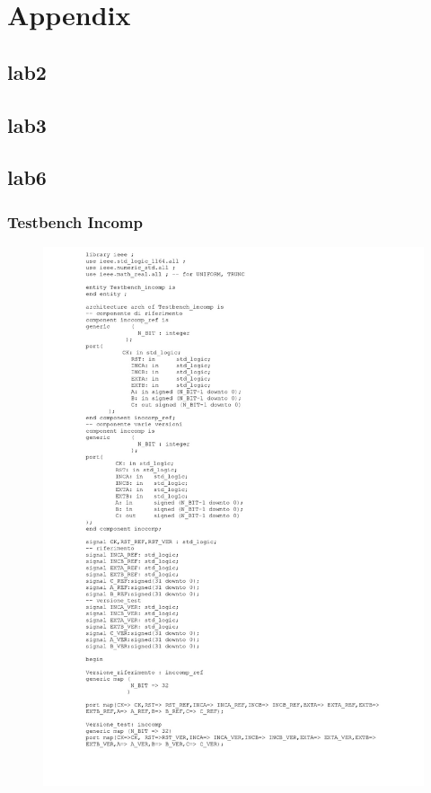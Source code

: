 \chapter{Appendix}
\section{lab2}
\section{lab3}
\newpage
\section{lab6}
\subsection{Testbench Incomp}
\begin{figure}[!htb]
	\centering
	\includegraphics[scale=0.25]{immagini/testbench_vhdl1}
	\label{testbench_vhdl1}
\end{figure}
